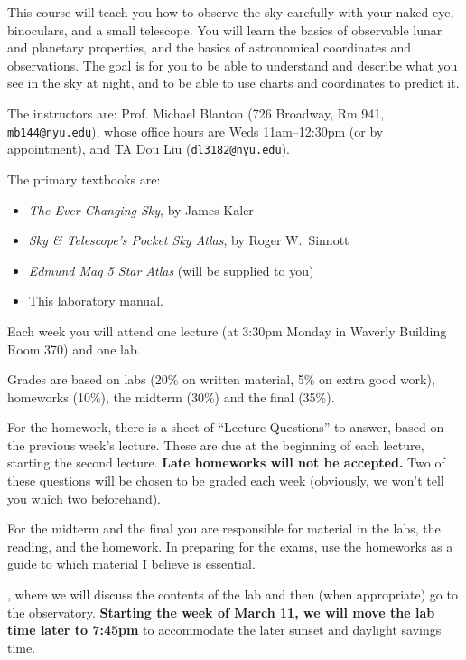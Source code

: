 \documentclass[11pt, preprint]{aastex}
\begin{document}

\noindent This course will teach you how to observe the sky carefully  
with your naked eye, binoculars, and a small telescope. You will learn
the basics of observable lunar and planetary properties, and the
basics of astronomical coordinates and observations. The goal is for
you to be able to understand and describe what you see in the sky at
night, and to be able to use charts and coordinates to predict it.

\noindent The instructors are: Prof. Michael Blanton (726 Broadway,
Rm 941, {\tt
  mb144@nyu.edu}), whose office hours are Weds 11am--12:30pm (or by
appointment), and TA Dou Liu ({\tt dl3182@nyu.edu}).
 
\noindent The primary textbooks are: 
\begin{itemize}
\item {\it The Ever-Changing Sky}, by James Kaler
\item {\it Sky \& Telescope's Pocket Sky Atlas}, by Roger W.~Sinnott
\item {\it Edmund Mag 5 Star Atlas} (will be supplied to you)
\item This laboratory manual. 
\end{itemize}

\noindent Each week you will attend one lecture (at 3:30pm Monday in
Waverly Building Room 370) and one lab. 

\noindent Grades are based on labs (20\% on written material, 5\% on
extra good work), homeworks (10\%), the midterm (30\%) and the final
(35\%). 

\noindent For the homework, there is a sheet of ``Lecture Questions''
to answer, based on the previous week's lecture. These are due at the
beginning of each lecture, starting the second lecture. {\bf Late
homeworks will not be accepted.}  Two of these questions will be
chosen to be graded each week (obviously, we won't tell you which two
beforehand).

\noindent For the midterm and the final you are responsible for
material in the labs, the reading, and the homework. In preparing for
the exams, use the homeworks as a guide to which material I believe is
essential.

, where
we will discuss the contents of the lab and then (when appropriate) go
to the observatory. {\bf Starting the week of March 11, we will move
the lab time later to 7:45pm} to accommodate the later sunset and
daylight savings time.
\end{document}
